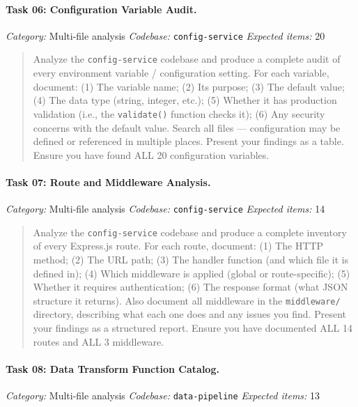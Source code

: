 \paragraph{Task 06: Configuration Variable Audit.}
\textit{Category:} Multi-file analysis \quad
\textit{Codebase:} \texttt{config-service} \quad
\textit{Expected items:} 20

\begin{quote}
Analyze the \texttt{config-service} codebase and produce a complete audit of every environment variable / configuration setting. For each variable, document: (1) The variable name; (2) Its purpose; (3) The default value; (4) The data type (string, integer, etc.); (5) Whether it has production validation (i.e., the \texttt{validate()} function checks it); (6) Any security concerns with the default value. Search all files --- configuration may be defined or referenced in multiple places. Present your findings as a table. Ensure you have found ALL 20 configuration variables.
\end{quote}

\paragraph{Task 07: Route and Middleware Analysis.}
\textit{Category:} Multi-file analysis \quad
\textit{Codebase:} \texttt{config-service} \quad
\textit{Expected items:} 14

\begin{quote}
Analyze the \texttt{config-service} codebase and produce a complete inventory of every Express.js route. For each route, document: (1) The HTTP method; (2) The URL path; (3) The handler function (and which file it is defined in); (4) Which middleware is applied (global or route-specific); (5) Whether it requires authentication; (6) The response format (what JSON structure it returns). Also document all middleware in the \texttt{middleware/} directory, describing what each one does and any issues you find. Present your findings as a structured report. Ensure you have documented ALL 14 routes and ALL 3 middleware.
\end{quote}

\paragraph{Task 08: Data Transform Function Catalog.}
\textit{Category:} Multi-file analysis \quad
\textit{Codebase:} \texttt{data-pipeline} \quad
\textit{Expected items:} 13


